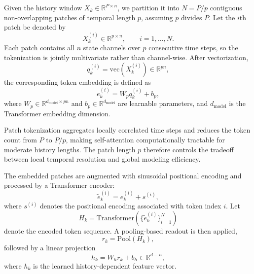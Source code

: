 \documentclass[journal]{IEEEtran}
\begin{document}
Given the history window $X_k \in \mathbb{R}^{P\times n}$, we partition it into $N=P/p$ contiguous non-overlapping patches of temporal length $p$, assuming $p$ divides $P$. Let the $i$th patch be denoted by
\begin{equation}
    X_k^{(i)} \in \mathbb{R}^{p\times n}, \qquad i=1,\ldots,N.
\end{equation}
Each patch contains all $n$ state channels over $p$ consecutive time steps, so the tokenization is jointly multivariate rather than channel-wise. After vectorization,
\begin{equation}
    q_k^{(i)} = \mathrm{vec}(X_k^{(i)}) \in \mathbb{R}^{pn},
\end{equation}
the corresponding token embedding is defined as
\begin{equation}
    e_k^{(i)} = W_p q_k^{(i)} + b_p,
    \label{eq:patch_embedding}
\end{equation}
where $W_p \in \mathbb{R}^{d_{\mathrm{model}}\times pn}$ and $b_p \in \mathbb{R}^{d_{\mathrm{model}}}$ are learnable parameters, and $d_{\mathrm{model}}$ is the Transformer embedding dimension.

Patch tokenization aggregates locally correlated time steps and reduces the token count from $P$ to $P/p$, making self-attention computationally tractable for moderate history lengths. The patch length $p$ therefore controls the tradeoff between local temporal resolution and global modeling efficiency.

The embedded patches are augmented with sinusoidal positional encoding and processed by a Transformer encoder:
\begin{equation}
    \tilde{e}_k^{(i)} = e_k^{(i)} + s^{(i)},
\end{equation}
where $s^{(i)}$ denotes the positional encoding associated with token index $i$. Let
\begin{equation}
    H_k = \mathrm{Transformer}\!\left(\bigl\{\tilde{e}_k^{(i)}\bigr\}_{i=1}^N\right)
    \label{eq:transformer_enc}
\end{equation}
denote the encoded token sequence. A pooling-based readout is then applied,
\begin{equation}
    r_k = \mathrm{Pool}(H_k),
\end{equation}
followed by a linear projection
\begin{equation}
    h_k = W_h r_k + b_h \in \mathbb{R}^{d-n},
    \label{eq:history_feature}
\end{equation}
where $h_k$ is the learned history-dependent feature vector.
\end{document}

